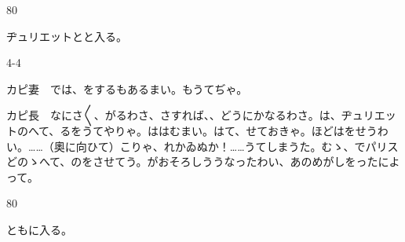\documentclass[tate,paper=b6j,jafontsize=9pt]{jlreq}
\begin{document}
\begin{azconvIndented}{8\zw}{0\zw}

ヂュリエットとと入る。

\end{azconvIndented}
\begin{azconvIndented}{4\zw}{-4\zw}

カピ妻　では、をするもあるまい。もうてぢゃ。

カピ長　なにさ{〳〵}、がるわさ、さすれば、、どうにかなるわさ。は、ヂュリエットのへて、るをうてやりゃ。ははむまい。はて、せておきゃ。ほどはをせうわい。……（奧に向ひて）こりゃ、れかゐぬか！……うてしまうた。むゝ、でパリスどのゝへて、のをさせてう。がおそろしううなったわい、あのめがしをったによって。

\end{azconvIndented}
\begin{azconvIndented}{8\zw}{0\zw}

ともに入る。

\end{azconvIndented}

\end{document}
